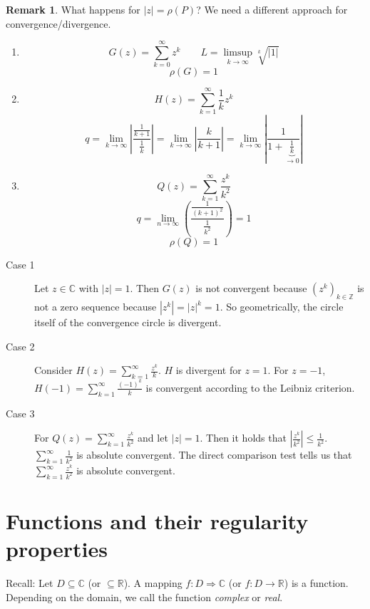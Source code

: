 \documentclass[a4paper,landscape,twocolumn]{article}
\theoremstyle{definition}
\newtheorem{rem}{Remark}
\newcommand\abs[1]{\left|#1\right|}
\begin{document}
\begin{rem}
  What happens for $\abs{z} = \rho(P)$?
  We need a different approach for convergence/divergence.
  \begin{enumerate}
    \item
      \[ G(z) = \sum_{k=0}^\infty z^k \qquad L = \limsup_{k\to\infty} \sqrt[k]{\abs{1}} \]
      \[ \rho(G) = 1 \]
    \item
      \[ H(z) = \sum_{k=1}^\infty \frac1k z^k \]
      \[
        q =
        \lim_{k\to\infty} \abs{\frac{\frac1{k+1}}{\frac1k}}
        = \lim_{k\to\infty} \abs{\frac{k}{k+1}}
        = \lim_{k\to\infty} \abs{\frac{1}{1 + \underbrace{\frac1k}_{\to0}}}
      \]
    \item
      \[ Q(z) = \sum_{k=1}^\infty \frac{z^k}{k^2} \]
      \[ q = \lim_{n\to\infty} \left(\frac{\frac{1}{(k+1)^2}}{\frac1{k^2}}\right) = 1 \]
      \[ \rho(Q) = 1 \]
  \end{enumerate}

  \begin{description}
    \item[Case 1]
      Let $z \in \mathbb C$ with $\abs{z} = 1$. Then $G(z)$ is not convergent
      because $(z^k)_{k\in\mathbb Z}$ is not a zero sequence because $\abs{z^k} = \abs{z}^k = 1$.
      So geometrically, the circle itself of the convergence circle is divergent.
    \item[Case 2]
      Consider $H(z) = \sum_{k=1}^\infty \frac{z^k}{k}$.
      $H$ is divergent for $z = 1$.
      For $z = -1$, $H(-1) = \sum_{k=1}^\infty \frac{(-1)^k}{k}$ is convergent according to the Leibniz criterion.
    \item[Case 3]
      For $Q(z) = \sum_{k=1}^\infty \frac{z^k}{k^2}$ and let $\abs{z} = 1$.
      Then it holds that $\abs{\frac{z^k}{k^2}} \leq \frac{1}{k^2}$.
      $\sum_{k=1}^\infty \frac{1}{k^2}$ is absolute convergent.
      The direct comparison test tells us that $\sum_{k=1}^\infty \frac{z^k}{k^2}$ is absolute convergent.
  \end{description}
\end{rem}

\section{Functions and their regularity properties}
%
Recall: Let $D \subseteq \mathbb C$ (or $\subseteq \mathbb R$).
A mapping $f: D \Rightarrow \mathbb C$ (or $f: D \rightarrow \mathbb R$)
is a function. Depending on the domain, we call the function \emph{complex}
or \emph{real}.
\end{document}
